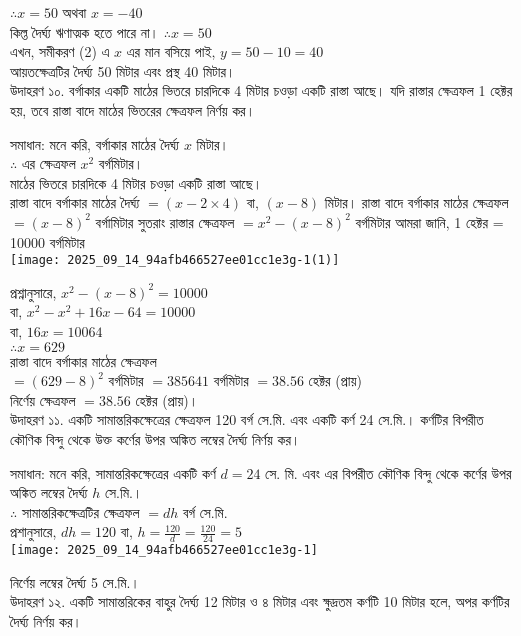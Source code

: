 \documentclass[10pt]{article}
\begin{document}
\(\therefore x=50\) অথবা \(x=-40\)\\
কিল্ত দৈর্ঘ্য ঋণাত্মক হতে পারে না। \(\therefore x=50\)\\
এখন, সমীকরণ (2) এ \(x\) এর মান বসিয়ে পাই, \(y=50-10=40\)\\
আয়তক্ষেত্রটির দৈর্ঘ্য 50 মিটার এবং প্রস্থ 40 মিটার।\\
উদাহরণ ১০. বর্গাকার একটি মাঠের ভিতরে চারদিকে 4 মিটার চওড়া একটি রাস্তা আছে। যদি রাস্তার ক্ষেত্রফল 1 হেক্টর হয়, তবে রাস্তা বাদে মাঠের ভিতরের ক্ষেত্রফল নির্ণয় কর।

সমাধান: মনে করি, বর্গাকার মাঠের দৈর্ঘ্য \(x\) মিটার।\\
\(\therefore\) এর ক্ষেত্রফল \(x^{2}\) বর্গমিটার।\\
মাঠের ভিতরে চারদিকে 4 মিটার চওড়া একটি রাস্তা আছে।\\
রাস্তা বাদে বর্গাকার মাঠের দৈর্ঘ্য \(=(x-2 \times 4)\) বা, \((x-8)\) মিটার। রাস্তা বাদে বর্গাকার মাঠের ক্ষেত্রফল \(=(x-8)^{2}\) বর্গামিটার সুতরাং রাস্তার ক্ষেত্রফল \(=x^{2}-(x-8)^{2}\) বর্গমিটার আমরা জানি, 1 হেক্টর = 10000 বর্গমিটার\\
\texttt{[image: 2025\_09\_14\_94afb466527ee01cc1e3g-1(1)]}

প্রশ্নানুসারে, \(x^{2}-(x-8)^{2}=10000\)\\
বা, \(x^{2}-x^{2}+16 x-64=10000\)\\
বা, \(16 x=10064\)\\
\(\therefore x=629\)\\
রাস্তা বাদে বর্গাকার মাঠের ক্ষেত্রফল\\
\(=(629-8)^{2}\) বর্গমিটার \(=385641\) বর্গমিটার \(=38.56\) হেক্টর (প্রায়)\\
নির্ণেয় ক্ষেত্রফল \(=38.56\) হেক্টর (প্রায়)।\\
উদাহরণ ১১. একটি সামান্তরিকক্ষেত্রের ক্ষেত্রফল 120 বর্গ সে.মি. এবং একটি কর্ণ 24 সে.মি.। কর্ণটির বিপরীত কৌণিক বিন্দু থেকে উক্ত কর্ণের উপর অঙ্কিত লম্বের দৈর্ঘ্য নির্ণয় কর।

সমাধান: মনে করি, সামান্তরিকক্ষেত্রের একটি কর্ণ \(d=24\) সে. মি. এবং এর বিপরীত কৌণিক বিন্দু থেকে কর্ণের উপর অঙ্কিত লম্বের দৈর্ঘ্য \(h\) সে.মি.।\\
\(\therefore\) সামান্তরিকক্ষেত্রটির ক্ষেত্রফল \(=d h\) বর্গ সে.মি.\\
প্রশানুসারে, \(d h=120\) বা, \(h=\frac{120}{d}=\frac{120}{24}=5\)\\
\texttt{[image: 2025\_09\_14\_94afb466527ee01cc1e3g-1]}

নির্ণেয় লম্বের দৈর্ঘ্য 5 সে.মি.।\\
উদাহরণ ১২. একটি সামান্তরিকের বাহুর দৈর্ঘ্য 12 মিটার ও ৪ মিটার এবং ক্ষুদ্রতম কর্ণটি 10 মিটার হলে, অপর কর্ণটির দৈর্ঘ্য নির্ণয় কর।
\end{document}
